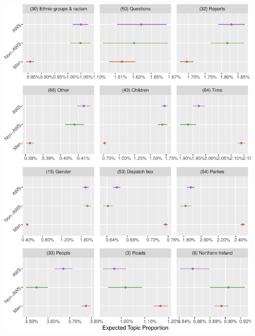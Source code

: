 \documentclass[]{article}
\let\origfigure\figure
\let\endorigfigure\endfigure
\renewenvironment{figure}[1][2] {
    \expandafter\origfigure\expandafter[H]
} {
    \endorigfigure
}
\theoremstyle{definition}
\theoremstyle{definition}
\theoremstyle{definition}
\theoremstyle{remark}
\begin{document}
\begin{table}[H]
\begin{table}[H]
\begin{table}[H]
\begin{table}[H]
\begin{table}[H]
\begin{table}[H]
\begin{table}[H]
\begin{table}[H]
\begin{figure}
\centering
\includegraphics{methodology_files/figure-latex/p-effect2-1.pdf}
\caption{\label{fig:p-effect2}Where AWS MPs are most similar to non-AWS
female MPs}
\end{figure}


\end{table}
\end{table}
\end{table}
\end{table}
\end{table}
\end{table}
\end{table}
\end{table}
\end{document}
